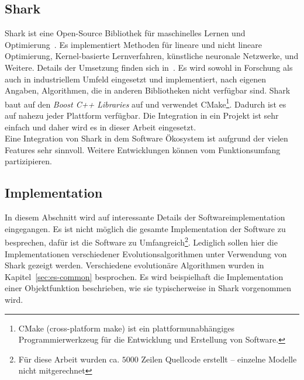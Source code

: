 %
\lstset{
	basicstyle=\scriptsize,
	language=C++,
	breaklines=true,
	frame=tbrl,
	breakatwhitespace=false
	breaklines=true,  
	xleftmargin=1cm,
	tabsize=2,
	showstringspaces=false}
%
\subsection{Shark}
\label{sec:Shark}
Shark ist eine Open-Source \cpp Bibliothek für maschinelles Lernen und Optimierung~\cite{Shark:1}. Es implementiert Methoden für lineare und nicht lineare Optimierung, Kernel-basierte Lernverfahren, künstliche neuronale Netzwerke, und Weitere. Details der Umsetzung finden sich in~\cite{shark08}. Es wird sowohl in Forschung als auch in industriellem Umfeld eingesetzt und implementiert, nach eigenen Angaben, Algorithmen, die in anderen Bibliotheken nicht verfügbar sind. Shark baut auf den \textit{Boost C++ Libraries} auf und verwendet CMake\footnote{CMake (cross-platform make) ist ein plattformunabhängiges Programmierwerkzeug für die Entwicklung und Erstellung von Software.}. Dadurch ist es auf nahezu jeder Plattform verfügbar. Die Integration in ein Projekt ist sehr einfach und daher wird es in dieser Arbeit eingesetzt.\\

Eine Integration von Shark in dem Software Ökosystem ist aufgrund der vielen Features sehr sinnvoll. Weitere Entwicklungen können vom Funktionsumfang partizipieren.

%
\subsection{Implementation}
\label{sec:Implementation}
In diesem Abschnitt wird auf interessante Details der Softwareimplementation eingegangen. Es ist nicht möglich die gesamte Implementation der Software zu besprechen, dafür ist die Software zu Umfangreich\footnote{Für diese Arbeit wurden ca. $5000$ Zeilen Quellcode erstellt -- einzelne Modelle nicht mitgerechnet}. Lediglich sollen hier die Implementationen verschiedener Evolutionsalgorithmen unter Verwendung von Shark gezeigt werden. Verschiedene evolutionäre Algorithmen wurden in Kapitel~\ref{sec:es-common} besprochen.%
\lipsum[1]
Es wird beispielhaft die Implementation einer Objektfunktion beschrieben, wie sie typischerweise in Shark vorgenommen wird.
%
%
%
